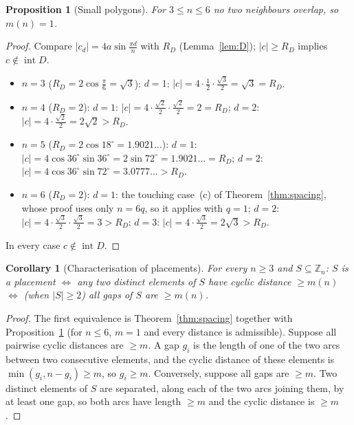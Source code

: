 \documentclass[11pt,a4paper]{article}
\newtheorem{proposition}[theorem]{Proposition}
\newtheorem{corollary}[theorem]{Corollary}
\theoremstyle{definition}
\theoremstyle{remark}
\newcommand{\Z}{\mathbb{Z}}
\newcommand{\inter}{\operatorname{int}}
\begin{document}
\begin{proposition}[Small polygons]\label{prop:small}
For $3\le n\le6$ no two neighbours overlap, so $m(n)=1$.
\end{proposition}
\begin{proof}
Compare $|c_d|=4a\sin\frac{\pi d}n$ with $R_D$ (Lemma~\ref{lem:D}); $|c|\ge R_D$ implies $c\notin\inter D$.
\begin{itemize}[nosep]
\item $n=3$ ($R_D=2\cos\frac\pi6=\sqrt3$): $d=1$: $|c|=4\cdot\tfrac12\cdot\tfrac{\sqrt3}2=\sqrt3=R_D$.
\item $n=4$ ($R_D=2$): $d=1$: $|c|=4\cdot\tfrac{\sqrt2}2\cdot\tfrac{\sqrt2}2=2=R_D$; $d=2$: $|c|=4\cdot\tfrac{\sqrt2}2=2\sqrt2>R_D$.
\item $n=5$ ($R_D=2\cos18^\circ=1.9021\ldots$): $d=1$: $|c|=4\cos36^\circ\sin36^\circ=2\sin72^\circ=1.9021\ldots=R_D$; $d=2$: $|c|=4\cos36^\circ\sin72^\circ=3.0777\ldots>R_D$.
\item $n=6$ ($R_D=2$): $d=1$: the touching case~(c) of Theorem~\ref{thm:spacing}, whose proof uses only $n=6q$, so it applies with $q=1$; $d=2$: $|c|=4\cdot\tfrac{\sqrt3}2\cdot\tfrac{\sqrt3}2=3>R_D$; $d=3$: $|c|=4\cdot\tfrac{\sqrt3}2=2\sqrt3>R_D$.
\end{itemize}
In every case $c\notin\inter D$.
\end{proof}

\begin{corollary}[Characterisation of placements]\label{cor:placements}
For every $n\ge3$ and $S\subseteq\Z_n$: $S$ is a placement $\iff$ any two distinct elements of $S$ have cyclic distance $\ge m(n)$ $\iff$ (when $|S|\ge2$) all gaps of $S$ are $\ge m(n)$.
\end{corollary}
\begin{proof}
The first equivalence is Theorem~\ref{thm:spacing} together with Proposition~\ref{prop:small} (for $n\le6$, $m=1$ and every distance is admissible).
Suppose all pairwise cyclic distances are $\ge m$. A gap $g_i$ is the length of one of the two arcs between two consecutive elements, and the cyclic distance of these elements is $\min(g_i,n-g_i)\ge m$, so $g_i\ge m$.
Conversely, suppose all gaps are $\ge m$. Two distinct elements of $S$ are separated, along each of the two arcs joining them, by at least one gap, so both arcs have length $\ge m$ and the cyclic distance is $\ge m$.
\end{proof}

\end{document}
